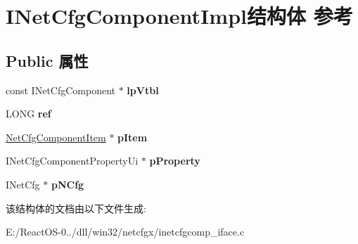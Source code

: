 \hypertarget{struct_i_net_cfg_component_impl}{}\section{I\+Net\+Cfg\+Component\+Impl结构体 参考}
\label{struct_i_net_cfg_component_impl}
\subsection*{Public 属性}
\begin{DoxyCompactItemize}
\item 
\mbox{\label{struct_i_net_cfg_component_impl_a683b973fb5c6cf3475ded89870013d79}} 
const I\+Net\+Cfg\+Component $\ast$ {\bfseries lp\+Vtbl}
\item 
\mbox{\label{struct_i_net_cfg_component_impl_aaa2876745459cbf4b9721127a6e6786d}} 
L\+O\+NG {\bfseries ref}
\item 
\mbox{\label{struct_i_net_cfg_component_impl_ad9ac30b9005722c3d38abfd7dda36c90}} 
\hyperlink{structtag_net_cfg_component_item}{Net\+Cfg\+Component\+Item} $\ast$ {\bfseries p\+Item}
\item 
\mbox{\label{struct_i_net_cfg_component_impl_a55e20ab4d8484469888b251d9b4db763}} 
I\+Net\+Cfg\+Component\+Property\+Ui $\ast$ {\bfseries p\+Property}
\item 
\mbox{\label{struct_i_net_cfg_component_impl_af9aa7c9840a3d152ba4a5ea8085e4628}} 
I\+Net\+Cfg $\ast$ {\bfseries p\+N\+Cfg}
\end{DoxyCompactItemize}


该结构体的文档由以下文件生成\+:\begin{DoxyCompactItemize}
\item 
E\+:/\+React\+O\+S-\/0../dll/win32/netcfgx/inetcfgcomp\+\_\+iface.\+c\end{DoxyCompactItemize}
